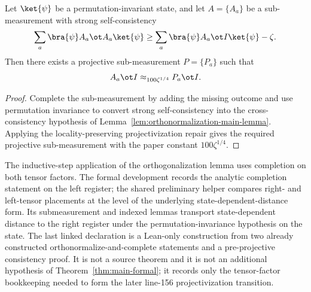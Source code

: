 \begin{theorem}\label{thm:orthonormalization}
	\leanok
	Let $\ket{\psi}$ be a permutation-invariant state,
	and let $A = \{A_a\}$ be a sub-measurement with strong self-consistency
	\[
		\sum_a \bra{\psi} A_a \ot A_a \ket{\psi}
		\geq
		\sum_a \bra{\psi} A_a \ot I \ket{\psi} - \zeta.
	\]
	Then there exists a projective sub-measurement $P = \{P_a\}$ such that
	\[
		A_a \ot I \approx_{100 \zeta^{1/4}} P_a \ot I.
	\]
\end{theorem}
\begin{proof}
	\leanok
	Complete the sub-measurement by adding the missing outcome and use
	permutation invariance to convert strong self-consistency into the
	cross-consistency hypothesis of
	Lemma~\ref{lem:orthonormalization-main-lemma}.  Applying the
	locality-preserving projectivization repair gives the required projective
	sub-measurement with the paper constant \(100\zeta^{1/4}\).
\end{proof}

\begin{remark}\label{rem:lean-right-register-completion-helpers}
	The inductive-step application of the orthogonalization lemma uses
	completion on both tensor factors.  The formal development records the
	analytic completion statement on the left register; the shared preliminary
	helper compares right- and left-tensor placements at the level of the
	underlying state-dependent-distance form.  Its submeasurement and indexed
	lemmas transport state-dependent distance to the right register under the
	permutation-invariance hypothesis on the state.  The last linked declaration
	is a Lean-only construction from two already constructed
	orthonormalize-and-complete statements and a pre-projective consistency
	proof.  It is not a source theorem and it is not an additional hypothesis of
	Theorem~\ref{thm:main-formal}; it records only the tensor-factor bookkeeping
	needed to form the later line-156 projectivization transition.
\end{remark}

